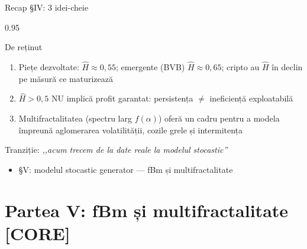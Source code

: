 \documentclass[9pt, aspectratio=169, t]{beamer}
\begin{document}
\begin{frame}[shrink=15]{Recap §IV: 3 idei-cheie}
\begin{cminipage}{0.95\textwidth}
\begin{block}{De reținut}
\begin{enumerate}\setlength{\itemsep}{4pt}
    \item Piețe dezvoltate: $\hat H\approx 0{,}55$; emergente (BVB) $\hat H\approx 0{,}65$; cripto au $\hat H$ în declin pe măsură ce maturizează
    \item $\hat H>0{,}5$ NU implică profit garantat: persistența $\neq$ ineficiență exploatabilă
    \item Multifractalitatea (spectru larg $f(\alpha)$) oferă un cadru pentru a modela împreună aglomerarea volatilității, cozile grele și intermitența
\end{enumerate}
\end{block}
\begin{exampleblock}{Tranziție: \textit{,,acum trecem de la date reale la modelul stocastic''}}
\begin{itemize}\setlength{\itemsep}{0pt}
    \item §V: modelul stocastic generator --- fBm și multifractalitate
\end{itemize}
\end{exampleblock}
\end{cminipage}
\end{frame}

\section{Partea V: fBm și multifractalitate [CORE]}
\end{document}
